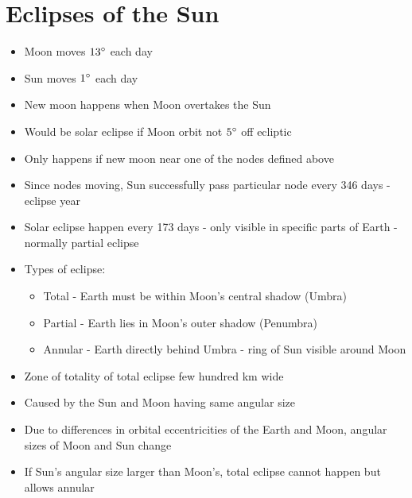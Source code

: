 \documentclass[a4paper, 11pt]{article}
\begin{document}
\section{Eclipses of the Sun}
	\begin{itemize}
		\item Moon moves \(13\degree\) each day
		\item Sun moves \(1\degree\) each day
		\item New moon happens when Moon overtakes the Sun
		\item Would be solar eclipse if Moon orbit not \(5\degree\) off ecliptic
		\item Only happens if new moon near one of the nodes defined above
		\item Since nodes moving, Sun successfully pass particular node every 346 days - eclipse year
		\item Solar eclipse happen every 173 days - only visible in specific parts of Earth - normally partial eclipse
		\item Types of eclipse:
		\begin{itemize}
			\item Total - Earth must be within Moon's central shadow (Umbra)
			\item Partial - Earth lies in Moon's outer shadow (Penumbra)
			\item Annular - Earth directly behind Umbra - ring of Sun visible around Moon
		\end{itemize}
		\item Zone of totality of total eclipse few hundred km wide
		\item Caused by the Sun and Moon having same angular size
		\item Due to differences in orbital eccentricities of the Earth and Moon, angular sizes of Moon and Sun change
		\item If Sun's angular size larger than Moon's, total eclipse cannot happen but allows annular
	\end{itemize}
\end{document}
